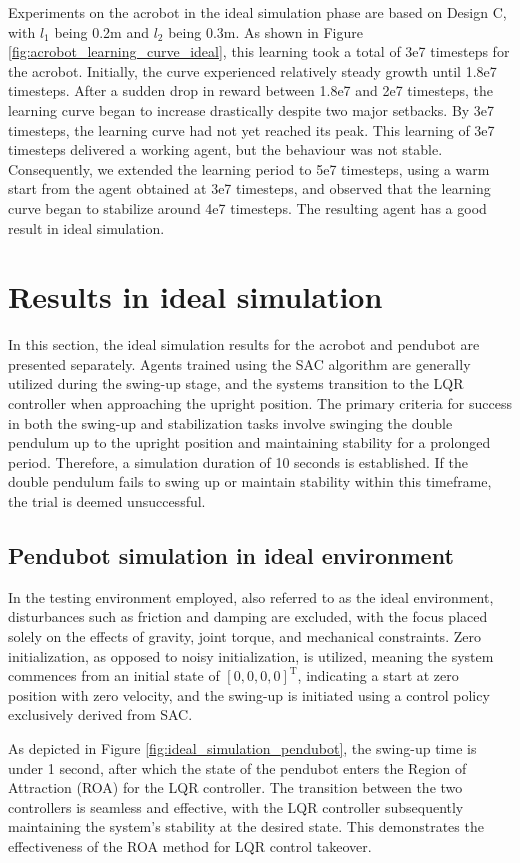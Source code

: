 Experiments on the acrobot in the ideal simulation phase are based on Design C, with \(l_1\) being 0.2m and \(l_2\) being 0.3m. As shown in Figure \ref{fig:acrobot_learning_curve_ideal}, this learning took a total of 3e7 timesteps for the acrobot. Initially, the curve experienced relatively steady growth until 1.8e7 timesteps. After a sudden drop in reward between 1.8e7 and 2e7 timesteps, the learning curve began to increase drastically despite two major setbacks. By 3e7 timesteps, the learning curve had not yet reached its peak. This learning of 3e7 timesteps delivered a working agent, but the behaviour was not stable. Consequently, we extended the learning period to 5e7 timesteps, using a warm start from the agent obtained at 3e7 timesteps, and observed that the learning curve began to stabilize around 4e7 timesteps. The resulting agent has a good result in ideal simulation.

\section{Results in ideal simulation}
In this section, the ideal simulation results for the acrobot and pendubot are presented separately. Agents trained using the SAC algorithm are generally utilized during the swing-up stage, and the systems transition to the LQR controller when approaching the upright position. The primary criteria for success in both the swing-up and stabilization tasks involve swinging the double pendulum up to the upright position and maintaining stability for a prolonged period. Therefore, a simulation duration of 10 seconds is established. If the double pendulum fails to swing up or maintain stability within this timeframe, the trial is deemed unsuccessful.

\subsection{Pendubot simulation in ideal environment}
In the testing environment employed, also referred to as the ideal environment, disturbances such as friction and damping are excluded, with the focus placed solely on the effects of gravity, joint torque, and mechanical constraints. Zero initialization, as opposed to noisy initialization, is utilized, meaning the system commences from an initial state of \([0,0,0,0]^\text{T}\), indicating a start at zero position with zero velocity, and the swing-up is initiated using a control policy exclusively derived from SAC.

As depicted in Figure \ref{fig:ideal_simulation_pendubot}, the swing-up time is under 1 second, after which the state of the pendubot enters the Region of Attraction (ROA) for the LQR controller. The transition between the two controllers is seamless and effective, with the LQR controller subsequently maintaining the system's stability at the desired state. This demonstrates the effectiveness of the ROA method for LQR control takeover.


